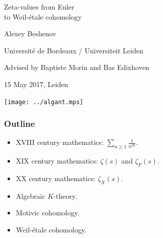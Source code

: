 \documentclass[handout]{beamer}
\begin{document}

\begin{frame}[noframenumbering]
  \headingfont
  \begin{center}
    {\huge Zeta-values from Euler\\
      to Weil-\'etale cohomology

    }

    \vspace{2em}

    {\large Alexey Beshenov}

    \vspace{0.20em}

    Universit\'e de Bordeaux / Universiteit Leiden

    \vspace{1em}

    {\large Advised by Baptiste Morin and Bas Edixhoven}

    \vspace{1em}

    {\tiny 15 May 2017, Leiden}

    \vspace{5em}

    \hspace{0.9cm}
    \hspace{0.9cm}
    \texttt{[image: ../algant.mps]}
  \end{center}
\end{frame}


\begin{frame}
  \frametitle{Outline}

  \begin{itemize}
  \item<2-> XVIII century mathematics: $\sum_{n\ge 1} \frac{1}{n^{2k}}$.

  \item<3-> XIX century mathematics: $\zeta (s)$ and $\zeta_F (s)$.

  \item<4-> XX century mathematics: $\zeta_X (s)$.

  \item<5-> Algebraic $K$-theory.

  \item<6-> Motivic cohomology.

  \item<7-> Weil-\'etale cohomology.
  \end{itemize}

\end{frame}
\end{document}
